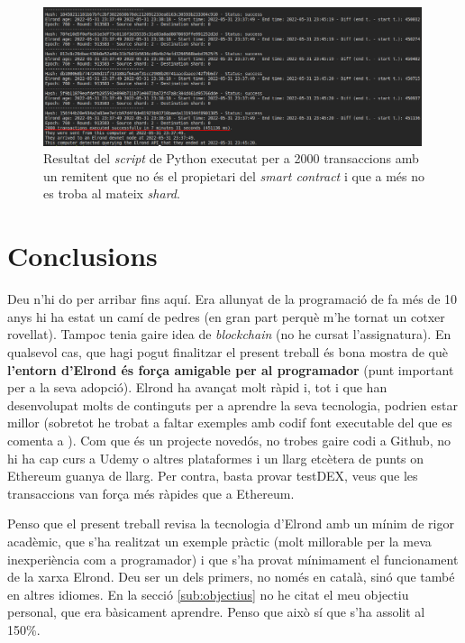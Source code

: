 \documentclass[11pt,a4paper]{article}
\begin{document}
\begin{figure}[h]
\includegraphics[width=0.99\textwidth]{send2000transnotownerothershards.png}
\centering
\caption{Resultat del \textit{script} de Python executat per a 2000 transaccions amb un remitent que no és el propietari del \textit{smart contract} i que a més no es troba al mateix \textit{shard}.}\label{fig:send2000transnotownerothershards}
\end{figure} 

\clearpage

\section{Conclusions}
Deu n'hi do per arribar fins aquí. Era allunyat de la programació de fa més de 10 anys hi ha estat un camí de pedres (en gran part perquè m'he tornat un cotxer rovellat). Tampoc tenia gaire idea de \textit{blockchain} (no he cursat l'assignatura). En qualsevol cas, que hagi pogut finalitzar el present treball és bona mostra de què \textbf{l'entorn d'Elrond és força amigable per al programador} (punt important per a la seva adopció). Elrond ha avançat molt ràpid i, tot i que han desenvolupat molts de continguts per a aprendre la seva tecnologia, podrien estar millor (sobretot he trobat a faltar exemples amb codif font executable del que es comenta a \cite{elrond2022}). Com que és un projecte novedós, no trobes gaire codi a Github, no hi ha cap curs a Udemy o altres plataformes i un llarg etcètera de punts on Ethereum guanya de llarg. Per contra, basta provar testDEX, veus que les transaccions van força més ràpides que a Ethereum.

Penso que el present treball revisa la tecnologia d'Elrond amb un mínim de rigor acadèmic, que s'ha realitzat un exemple pràctic (molt millorable per la meva inexperiència com a programador) i que s'ha provat mínimament el funcionament de la xarxa Elrond. Deu ser un dels primers, no només en català, sinó que també en altres idiomes. En la secció \ref{sub:objectius} no he citat el meu objectiu personal, que era bàsicament aprendre. Penso que això sí que s'ha assolit al 150\%.
\end{document}
